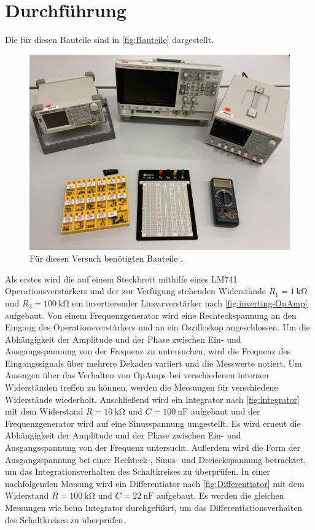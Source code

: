 \section{Durchführung}
\label{sec:Durchführung}

Die für diesen  Bauteile sind in \autoref{fig:Bauteile} dargestellt.
\begin{figure}[H]
    \centering
    \includegraphics[width=0.4\linewidth]{figures/Aufbau.png}
    \caption{Für diesen Versuch benötigten Bauteile \cite{Anleitung51}.}
    \label{fig:Bauteile}
\end{figure}
\noindent
Als erstes wird die auf einem Steckbrett mithilfe eines LM741 Operationsverstärkers und der zur Verfügung stehenden Widerstände $R_1=\SI{1}{\kilo\ohm}$ und $R_2=\SI{100}{\kilo\ohm}$ ein invertierender Linearverstärker nach \autoref{fig:inverting-OpAmp} aufgebaut.
Von einem Frequenzgenerator wird eine Rechteckspannung an den Eingang des Operationsverstärkers und an ein Oszilloskop angeschlossen.
Um die Abhängigkeit der Amplitude und der Phase zwischen Ein- und Ausgangsspannung von der Frequenz zu untersuchen, wird die Frequenz des Eingangssignals über mehrere Dekaden variiert und die Messwerte notiert.
Um Aussagen über das Verhalten von OpAmps bei verschiedenen internen Widerständen treffen zu können, werden die Messungen für verschiedene Widerstände wiederholt. \newline
Anschließend wird ein Integrator nach \autoref{fig:integrator} mit dem Widerstand $R=\SI{10}{\kilo\ohm}$ und $C=\SI{100}{\nano\farad}$ aufgebaut und der Frequenzgenerator wird auf eine Sinusspannung umgestellt.
Es wird erneut die Abhängigkeit der Amplitude und der Phase zwischen Ein- und Ausgangsspannung von der Frequenz untersucht.
Außerdem wird die Form der Ausgangsspannung bei einer Rechteck-, Sinus- und Dreieckspannung betrachtet, um das Integrationsverhalten des Schaltkreises zu überprüfen. \newline
In einer nachfolgenden Messung wird ein Differentiator nach \autoref{fig:Differentiator} mit dem Widerstand $R=\SI{100}{\kilo\ohm}$ und $C=\SI{22}{\nano\farad}$ aufgebaut.
Es werden die gleichen Messungen wie beim Integrator durchgeführt, um das Differentiationsverhalten des Schaltkreises zu überprüfen.
